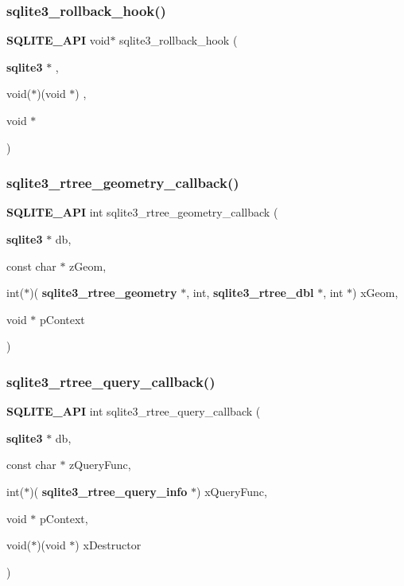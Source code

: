 \mbox{\label{sqlite3_8h_a58d161e149f84c81995d8ec3bd10dd31}} 
\subsubsection{sqlite3\_rollback\_hook()}
{\footnotesize\ttfamily \textbf{ S\+Q\+L\+I\+T\+E\+\_\+\+A\+PI} void$\ast$ sqlite3\+\_\+rollback\+\_\+hook (\begin{DoxyParamCaption}\item[{\textbf{ sqlite3} $\ast$}]{,  }\item[{void($\ast$)(void $\ast$)}]{,  }\item[{void $\ast$}]{ }\end{DoxyParamCaption})}

\mbox{\label{sqlite3_8h_ac36215481c9c7551905f03710f541d2c}} 
\subsubsection{sqlite3\_rtree\_geometry\_callback()}
{\footnotesize\ttfamily \textbf{ S\+Q\+L\+I\+T\+E\+\_\+\+A\+PI} int sqlite3\+\_\+rtree\+\_\+geometry\+\_\+callback (\begin{DoxyParamCaption}\item[{\textbf{ sqlite3} $\ast$}]{db,  }\item[{const char $\ast$}]{z\+Geom,  }\item[{int($\ast$)(\textbf{ sqlite3\+\_\+rtree\+\_\+geometry} $\ast$, int, \textbf{ sqlite3\+\_\+rtree\+\_\+dbl} $\ast$, int $\ast$)}]{x\+Geom,  }\item[{void $\ast$}]{p\+Context }\end{DoxyParamCaption})}

\mbox{\label{sqlite3_8h_ae95b6b6826ed9f14bec4900c33f7288a}} 
\subsubsection{sqlite3\_rtree\_query\_callback()}
{\footnotesize\ttfamily \textbf{ S\+Q\+L\+I\+T\+E\+\_\+\+A\+PI} int sqlite3\+\_\+rtree\+\_\+query\+\_\+callback (\begin{DoxyParamCaption}\item[{\textbf{ sqlite3} $\ast$}]{db,  }\item[{const char $\ast$}]{z\+Query\+Func,  }\item[{int($\ast$)(\textbf{ sqlite3\+\_\+rtree\+\_\+query\+\_\+info} $\ast$)}]{x\+Query\+Func,  }\item[{void $\ast$}]{p\+Context,  }\item[{void($\ast$)(void $\ast$)}]{x\+Destructor }\end{DoxyParamCaption})}

